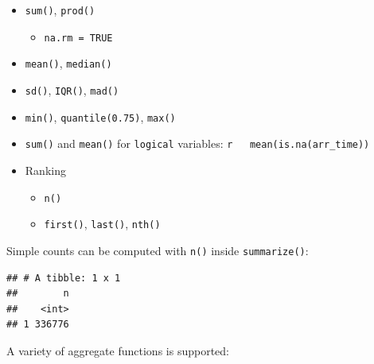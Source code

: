 \documentclass[]{book}
\newenvironment{Shaded}{}{}
\newcommand{\DataTypeTok}[1]{#1}
\newcommand{\KeywordTok}[1]{\textcolor[rgb]{0.00,0.00,1.00}{#1}}
\newcommand{\NormalTok}[1]{#1}
\newcommand{\OperatorTok}[1]{#1}
\newcommand{\OtherTok}[1]{\textcolor[rgb]{1.00,0.25,0.00}{#1}}
\newcommand{\StringTok}[1]{\textcolor[rgb]{0.00,0.50,0.50}{#1}}
\providecommand{\tightlist}{%
  \setlength{\itemsep}{0pt}\setlength{\parskip}{0pt}}
\begin{document}
\begin{itemize}
\item
  \texttt{sum()}, \texttt{prod()}

  \begin{itemize}
  \tightlist
  \item
    \texttt{na.rm\ =\ TRUE}
  \end{itemize}
\item
  \texttt{mean()}, \texttt{median()}
\item
  \texttt{sd()}, \texttt{IQR()}, \texttt{mad()}
\item
  \texttt{min()}, \texttt{quantile(0.75)}, \texttt{max()}
\item
  \texttt{sum()} and \texttt{mean()} for \texttt{logical} variables:
  \texttt{r\ \ \ mean(is.na(arr\_time))}
\item
  Ranking

  \begin{itemize}
  \tightlist
  \item
    \texttt{n()}
  \item
    \texttt{first()}, \texttt{last()}, \texttt{nth()}
  \end{itemize}
\end{itemize}

Simple counts can be computed with \texttt{n()} inside \texttt{summarize()}:

\begin{Shaded}
\end{Shaded}

\begin{verbatim}
## # A tibble: 1 x 1
##        n
##    <int>
## 1 336776
\end{verbatim}

A variety of aggregate functions is supported:

\begin{Shaded}
\end{Shaded}
\end{document}
